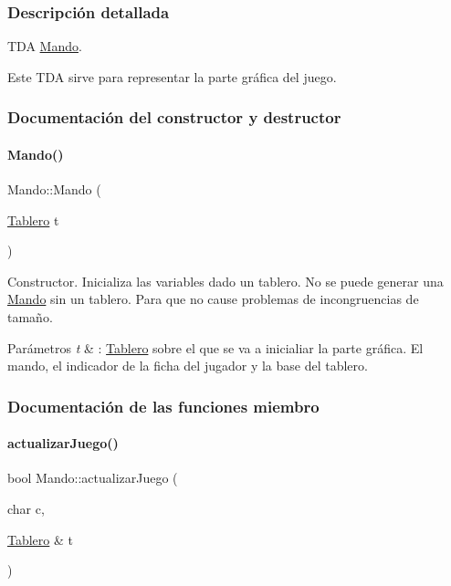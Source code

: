 \subsubsection{Descripción detallada}
T\+DA \hyperlink{classMando}{Mando}. 

Este T\+DA sirve para representar la parte gráfica del juego. 

\subsubsection{Documentación del constructor y destructor}
\hypertarget{classMando_a2e2ed3e8f3502f7d99cee3e1278cafb9}{}\label{classMando_a2e2ed3e8f3502f7d99cee3e1278cafb9} 
\paragraph{\texorpdfstring{Mando()}{Mando()}}
{\footnotesize\ttfamily Mando\+::\+Mando (\begin{DoxyParamCaption}\item[{\hyperlink{classTablero}{Tablero}}]{t }\end{DoxyParamCaption})}



Constructor. Inicializa las variables dado un tablero. No se puede generar una \hyperlink{classMando}{Mando} sin un tablero. Para que no cause problemas de incongruencias de tamaño. 


\begin{DoxyParams}{Parámetros}
{\em t} & \+: \hyperlink{classTablero}{Tablero} sobre el que se va a inicialiar la parte gráfica. El mando, el indicador de la ficha del jugador y la base del tablero. \\
\hline
\end{DoxyParams}


\subsubsection{Documentación de las funciones miembro}
\hypertarget{classMando_ac65c5bfbd7c268e1916c96b9e71e66f9}{}\label{classMando_ac65c5bfbd7c268e1916c96b9e71e66f9} 
\paragraph{\texorpdfstring{actualizar\+Juego()}{actualizarJuego()}}
{\footnotesize\ttfamily bool Mando\+::actualizar\+Juego (\begin{DoxyParamCaption}\item[{char}]{c,  }\item[{\hyperlink{classTablero}{Tablero} \&}]{t }\end{DoxyParamCaption})}



